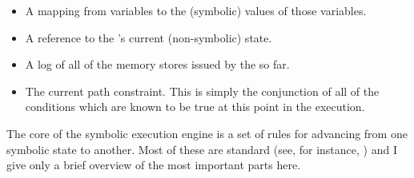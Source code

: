 \begin{itemize}
\item
  A mapping from {\StateMachine} variables to the (symbolic) values of
  those variables.
\item
  A reference to the {\StateMachine}'s current (non-symbolic) state.
\item
  A log of all of the memory stores issued by the {\StateMachine} so
  far.
\item
  The current path constraint.  This is simply the conjunction of
  all of the conditions which are known to be true at this point in
  the execution.
\end{itemize}

The core of the symbolic execution engine is a set of rules for
advancing from one symbolic state to another.  Most of these are
standard (see, for instance, ) and I give only a brief overview of the most important
parts here.


